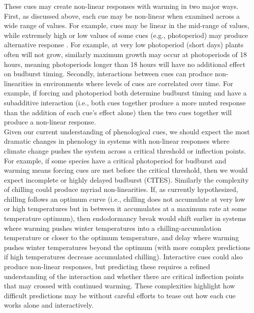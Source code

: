 \documentclass[11pt,letter]{article}
\begin{document}
These cues may create non-linear responses with warming in two major ways. First, as discussed above, each cue may be non-linear when examined across a wide range of values. For example, cues may be linear in the mid-range of values, while extremely high or low values of some cues (e.g., photoperiod) may produce alternative response \citep{gauzere2017}. For example, at very low photoperiod (short days) plants often will not grow, similarly maximum growth may occur at photoperiods of 18 hours, meaning photoperiods longer than 18 hours will have no additional effect on budburst timing. Secondly, interactions between cues can produce non-linearities in environments where levels of cues are correlated over time. For example, if forcing and photoperiod both determine budburst timing and have a subadditive interaction (i.e., both cues together produce a more muted response than the addition of each cue's effect alone) then the two cues together will produce a non-linear response. \\ %

Given our current understanding of phenological cues, we should expect the most dramatic changes in phenology in systems with non-linear responses where climate change pushes the system across a critical threshold or inflection points. For example, if some species have a critical photoperiod for budburst and warming means forcing cues are met before the critical threshold, then we would expect incomplete or highly delayed budburst (CITES). Similarly the complexity of chilling could produce myriad non-linearities. If, as currently hypothesized, chilling follows an optimum curve (i.e., chilling does not accumulate at very low or high temperatures but in between it accumulates at a maximum rate at some temperature optimum), then endodormancy break would shift earlier in systems where warming pushes winter temperatures into a chilling-accumulation temperature or closer to the optimum temperature, and delay where warming pushes winter temperatures beyond the optimum (with more complex predictions if high temperatures decrease accumulated chilling). Interactive cues could also produce non-linear responses, but predicting these requires a refined understanding of the interaction and whether there are critical inflection points that may crossed with continued warming. These complexities highlight how difficult predictions may be without careful efforts to tease out how each cue works alone and interactively. 
\end{document}
